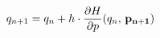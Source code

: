 \documentclass[preview]{standalone}
\begin{document}
\begin{align*}
\special{dvisvgm:raw <g id='unique000'>}q_{n+1} &= q_n + h \cdot \frac{\partial H}{\partial p}(q_n,\, \mathbf{p_{n+1}})\special{dvisvgm:raw </g>}
\end{align*}
\end{document}
